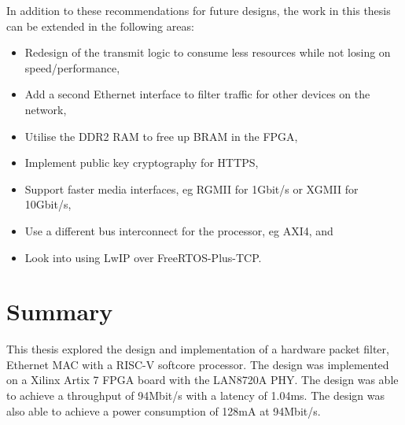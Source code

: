 In addition to these recommendations for future designs, the work in this thesis can be extended in the following areas:

\begin{itemize}
    \item Redesign of the transmit logic to consume less resources while not losing on speed/performance, 
    \item Add a second Ethernet interface to filter traffic for other devices on the network, 
    \item Utilise the DDR2 RAM to free up BRAM in the FPGA, 
    \item Implement public key cryptography for HTTPS,
    \item Support faster media interfaces, eg RGMII for 1Gbit/s or XGMII for 10Gbit/s,
    \item Use a different bus interconnect for the processor, eg AXI4, and
    \item Look into using LwIP over FreeRTOS-Plus-TCP.
\end{itemize}




\section{Summary}

This thesis explored the design and implementation of a hardware packet filter, Ethernet MAC with a RISC-V softcore processor. The design was implemented on a Xilinx Artix 7 FPGA board with the LAN8720A PHY. The design was able to achieve a throughput of 94Mbit/s with a latency of 1.04ms. The design was also able to achieve a power consumption of 128mA at 94Mbit/s. 
